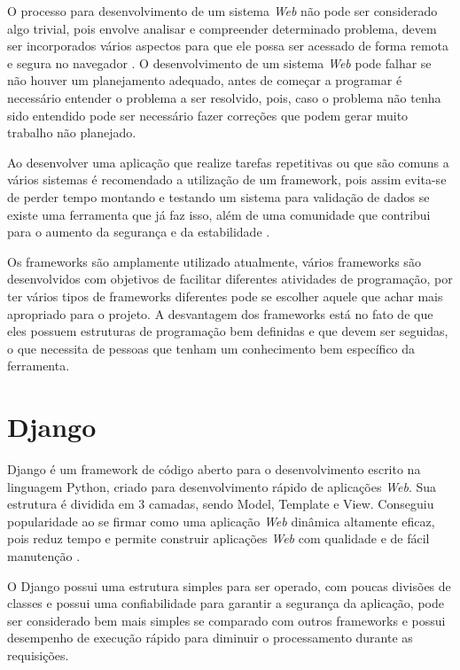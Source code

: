\documentclass{ifto-tex}
\begin{document}
O processo para desenvolvimento de um sistema \textit{Web} não pode ser considerado algo trivial, pois envolve analisar e compreender determinado problema, devem ser incorporados vários aspectos para que ele possa ser acessado de forma remota e segura no navegador \cite{miletto2014desenvolvimento}. O desenvolvimento de um sistema \textit{Web} pode falhar se não houver um planejamento adequado, antes de começar a programar é necessário entender o problema a ser resolvido, pois, caso o problema não tenha sido entendido pode ser necessário fazer correções que podem gerar muito trabalho não planejado.

Ao desenvolver uma aplicação que realize tarefas repetitivas ou que são comuns a vários sistemas é recomendado a utilização de um framework, pois assim evita-se de perder tempo montando e testando um sistema para validação de dados se existe uma ferramenta que já faz isso, além de uma comunidade que contribui para o aumento da segurança e da estabilidade \cite{OqueeumF24:online}.

Os frameworks são amplamente utilizado atualmente, vários frameworks são desenvolvidos com objetivos de facilitar diferentes atividades de programação, por ter vários tipos de frameworks diferentes pode se escolher aquele que achar mais apropriado para o projeto. A desvantagem dos frameworks está no fato de que eles possuem estruturas de programação bem definidas e que devem ser seguidas, o que necessita de pessoas que tenham um conhecimento bem específico da ferramenta.


\section{Django}
Django é um framework de código aberto para o desenvolvimento escrito na linguagem Python, criado para desenvolvimento rápido de aplicações \textit{Web}.  Sua estrutura é dividida em 3 camadas, sendo Model, Template e View. Conseguiu popularidade ao se firmar como uma aplicação \textit{Web} dinâmica altamente eficaz, pois reduz tempo e permite construir aplicações \textit{Web} com qualidade e de fácil manutenção \cite{badindesenvolvimento}.

O Django possui uma estrutura simples para ser operado, com poucas divisões de classes e possui uma confiabilidade para garantir a segurança da aplicação, pode ser considerado bem mais simples se comparado com outros frameworks e possui desempenho de execução rápido para diminuir o processamento durante as requisições.
\end{document}
